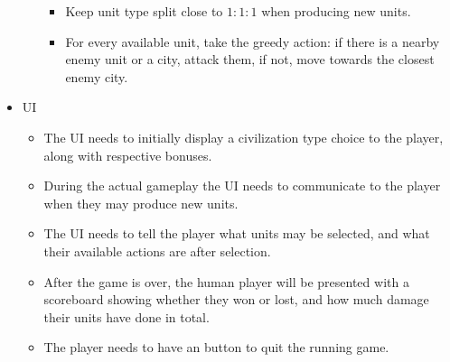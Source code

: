 \documentclass[11pt]{amsart}
\begin{document}
\begin{itemize}
\begin{itemize}
        \begin{itemize}
            \item Keep unit type split close to $1:1:1$ when producing new units.
            \item For every available unit, take the greedy action: if there is a nearby enemy unit or a city, attack them, if not, move towards the closest enemy city.
        \end{itemize}
    \end{itemize}
    \item UI
    \begin{itemize}
        \item The UI needs to initially display a civilization type choice to the player, along with respective bonuses.
        \item During the actual gameplay the UI needs to communicate to the player when they may produce new units.
        \item The UI needs to tell the player what units may be selected, and what their available actions are after selection.
        \item After the game is over, the human player will be presented with a scoreboard showing whether they won or lost, and how much damage their units have done in total.
        \item The player needs to have an button to quit the running game.
    \end{itemize}
\end{itemize}

\newpage
\end{document}
